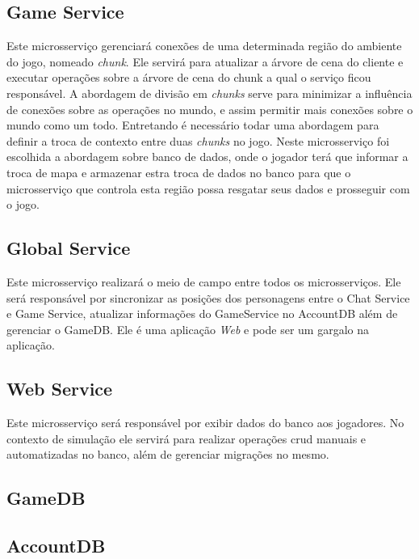 \subsection{Game Service}



Este microsserviço gerenciará conexões de uma determinada região do ambiente do jogo, nomeado \textit{chunk}.
%
Ele servirá para atualizar a árvore de cena do cliente e executar operações sobre a árvore de cena do chunk a qual o serviço ficou responsável.
%
A abordagem de divisão em \textit{chunks} serve para minimizar a influência de conexões sobre as operações no mundo, e assim permitir mais conexões sobre o mundo como um todo.
%
Entretando é necessário todar uma abordagem para definir a troca de contexto entre duas \textit{chunks} no jogo.
%
Neste microsserviço foi escolhida a abordagem sobre banco de dados, onde o jogador terá que informar a troca de mapa e armazenar estra troca de dados no banco para que o microsserviço que controla esta região possa resgatar seus dados e prosseguir com o jogo.



\subsection{Global Service}

Este microsserviço realizará o meio de campo entre todos os microsserviços.
%
Ele será responsável por sincronizar as posições dos personagens entre o Chat Service e Game Service, atualizar informações do GameService no AccountDB além de gerenciar o GameDB.
%
Ele é uma aplicação \textit{Web} e pode ser um gargalo na aplicação.

\subsection{Web Service}

Este microsserviço será responsável por exibir dados do banco aos jogadores.
%
No contexto de simulação ele servirá para realizar operações \ac{crud} manuais e automatizadas no banco, além de gerenciar migrações no mesmo.

\subsection{GameDB}

\subsection{AccountDB}
